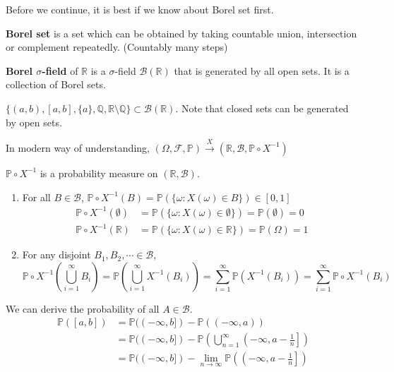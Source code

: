 \documentclass{huhtakm-template-book}
\newcommand{\prob}{\mathbb{P}}
\begin{document}
Before we continue, it is best if we know about Borel set first.
\begin{defn}
	\textbf{Borel set} is a set which can be obtained by taking countable union, intersection or complement repeatedly. (Countably many steps)
\end{defn}
\begin{defn}
	\textbf{Borel $\sigma$-field} of $\mathbb{R}$ is a $\sigma$-field $\mathcal{B}(\mathbb{R})$ that is generated by all open sets. It is a collection of Borel sets.
\end{defn}
\begin{eg}
	$\{(a,b),[a,b],\{a\},\mathbb{Q},\mathbb{R}\setminus\mathbb{Q}\}\subset\mathcal{B}(\mathbb{R})$. Note that closed sets can be generated by open sets.
\end{eg}
\begin{rem}
	In modern way of understanding, $(\Omega,\mathcal{F},\prob)\xrightarrow{X}(\mathbb{R},\mathcal{B},\prob\circ X^{-1})$
\end{rem}
\begin{cla}
	$\prob\circ X^{-1}$ is a probability measure on $(\mathbb{R},\mathcal{B})$.
\end{cla}
\begin{proofing}
	\begin{enumerate}
		\item For all $B\in\mathcal{B}$, $\prob\circ X^{-1}(B)=\prob(\{\omega:X(\omega)\in B\})\in [0,1]$
		\begin{align*}
			\prob\circ X^{-1}(\emptyset)&=\prob(\{\omega:X(\omega)\in\emptyset\})=\prob(\emptyset)=0\\
			\prob\circ X^{-1}(\mathbb{R})&=\prob(\{\omega:X(\omega)\in\mathbb{R}\})=\prob(\Omega)=1
		\end{align*}
		\item For any disjoint $B_{1},B_{2},\cdots\in\mathcal{B}$,
		\begin{equation*}
			\prob\circ X^{-1}\left(\bigcup_{i=1}^{\infty}B_{i}\right)=\prob\left(\bigcup_{i=1}^{\infty}X^{-1}(B_{i})\right)=\sum_{i=1}^{\infty}\prob(X^{-1}(B_{i}))=\sum_{i=1}^{\infty}\prob\circ X^{-1}(B_{i})
		\end{equation*}
	\end{enumerate}
\end{proofing}
\begin{rem}
	We can derive the probability of all $A\in\mathcal{B}$.
	\begin{align*}
		\prob([a,b])&=\prob((-\infty,b])-\prob((-\infty,a))\\
		&=\prob((-\infty,b])-\prob\left(\bigcup_{n=1}^{\infty}\left(-\infty,a-\frac{1}{n}\right]\right)\\
		&=\prob((-\infty,b])-\lim_{n\to\infty}\prob\left(\left(-\infty,a-\frac{1}{n}\right]\right)
	\end{align*}
\end{rem}
\end{document}
